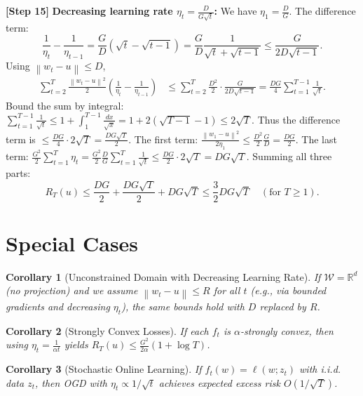 \documentclass{article}
\newtheorem{corollary}{Corollary}
\newcommand{\R}{\mathbb{R}}
\newcommand{\norm}[1]{\left\| #1 \right\|}
\newcommand{\step}[1]{\textbf{[Step #1]}}
\begin{document}
\step{15} \textbf{Decreasing learning rate $\eta_t = \frac{D}{G\sqrt{t}}$:} We have $\eta_1 = \frac{D}{G}$. The difference term:
\begin{equation}
    \frac{1}{\eta_t} - \frac{1}{\eta_{t-1}} = \frac{G}{D}(\sqrt{t} - \sqrt{t-1}) = \frac{G}{D} \frac{1}{\sqrt{t} + \sqrt{t-1}} \le \frac{G}{2D\sqrt{t-1}}. \tag{15}
\end{equation}
Using $\norm{w_t - u} \le D$,
\begin{align}
    \sum_{t=2}^T \frac{\norm{w_t - u}^2}{2} \left( \frac{1}{\eta_t} - \frac{1}{\eta_{t-1}} \right)
    &\le \sum_{t=2}^T \frac{D^2}{2} \cdot \frac{G}{2D\sqrt{t-1}} = \frac{DG}{4} \sum_{t=1}^{T-1} \frac{1}{\sqrt{t}}. \tag{16}
\end{align}
Bound the sum by integral: $\sum_{t=1}^{T-1} \frac{1}{\sqrt{t}} \le 1 + \int_1^{T-1} \frac{dx}{\sqrt{x}} = 1 + 2(\sqrt{T-1} - 1) \le 2\sqrt{T}$.
Thus the difference term is $\le \frac{DG}{4} \cdot 2\sqrt{T} = \frac{DG\sqrt{T}}{2}$.
The first term: $\frac{\norm{w_1-u}^2}{2\eta_1} \le \frac{D^2}{2} \frac{G}{D} = \frac{DG}{2}$.
The last term: $\frac{G^2}{2} \sum_{t=1}^T \eta_t = \frac{G^2}{2} \frac{D}{G} \sum_{t=1}^T \frac{1}{\sqrt{t}} \le \frac{DG}{2} \cdot 2\sqrt{T} = DG\sqrt{T}$.
Summing all three parts:
\begin{equation}
    R_T(u) \le \frac{DG}{2} + \frac{DG\sqrt{T}}{2} + DG\sqrt{T} \le \frac{3}{2} DG\sqrt{T} \quad (\text{for } T \ge 1). \tag{17}
\end{equation}

\section*{Special Cases}

\begin{corollary}[Unconstrained Domain with Decreasing Learning Rate]
If $\mathcal{W} = \R^d$ (no projection) and we assume $\norm{w_t - u} \le R$ for all $t$ (e.g., via bounded gradients and decreasing $\eta_t$), the same bounds hold with $D$ replaced by $R$.
\end{corollary}

\begin{corollary}[Strongly Convex Losses]
If each $f_t$ is $\alpha$-strongly convex, then using $\eta_t = \frac{1}{\alpha t}$ yields $R_T(u) \le \frac{G^2}{2\alpha} (1 + \log T)$.
\end{corollary}

\begin{corollary}[Stochastic Online Learning]
If $f_t(w) = \ell(w; z_t)$ with i.i.d. data $z_t$, then OGD with $\eta_t \propto 1/\sqrt{t}$ achieves expected excess risk $O(1/\sqrt{T})$.
\end{corollary}
\end{document}
